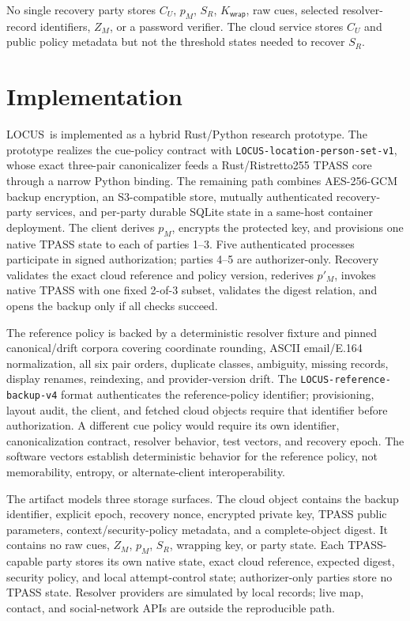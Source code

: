 \documentclass[sigconf,anonymous]{acmart}
\newcommand{\LOCUS}{\textsf{LOCUS}}
\begin{document}
No single recovery party stores \(C_U\), \(p_M\), \(S_R\), \(K_{\mathsf{wrap}}\), raw cues, selected resolver-record identifiers, \(Z_M\), or a password verifier. The cloud service stores \(C_U\) and public policy metadata but not the threshold states needed to recover \(S_R\).

\section{Implementation}
\label{sec:implementation}

\LOCUS\ is implemented as a hybrid Rust/Python research prototype. The prototype realizes the cue-policy contract with \texttt{LOCUS-location-person-set-v1}, whose exact three-pair canonicalizer feeds a Rust/Ristretto255 TPASS core through a narrow Python binding. The remaining path combines AES-256-GCM backup encryption, an S3-compatible store, mutually authenticated recovery-party services, and per-party durable SQLite state in a same-host container deployment. The client derives \(p_M\), encrypts the protected key, and provisions one native TPASS state to each of parties 1--3. Five authenticated processes participate in signed authorization; parties 4--5 are authorizer-only. Recovery validates the exact cloud reference and policy version, rederives \(p'_M\), invokes native TPASS with one fixed 2-of-3 subset, validates the digest relation, and opens the backup only if all checks succeed.

The reference policy is backed by a deterministic resolver fixture and pinned canonical/drift corpora covering coordinate rounding, ASCII email/E.164 normalization, all six pair orders, duplicate classes, ambiguity, missing records, display renames, reindexing, and provider-version drift. The \texttt{LOCUS-reference-backup-v4} format authenticates the reference-policy identifier; provisioning, layout audit, the client, and fetched cloud objects require that identifier before authorization. A different cue policy would require its own identifier, canonicalization contract, resolver behavior, test vectors, and recovery epoch. The software vectors establish deterministic behavior for the reference policy, not memorability, entropy, or alternate-client interoperability.

The artifact models three storage surfaces. The cloud object contains the backup identifier, explicit epoch, recovery nonce, encrypted private key, TPASS public parameters, context/security-policy metadata, and a complete-object digest. It contains no raw cues, \(Z_M\), \(p_M\), \(S_R\), wrapping key, or party state. Each TPASS-capable party stores its own native state, exact cloud reference, expected digest, security policy, and local attempt-control state; authorizer-only parties store no TPASS state. Resolver providers are simulated by local records; live map, contact, and social-network APIs are outside the reproducible path.
\end{document}
